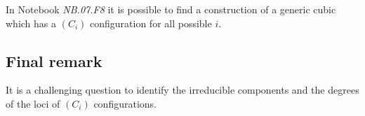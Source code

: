 \documentclass[a4paper, 11pt, reqno]{amsart}
\theoremstyle{plain}
\theoremstyle{definition}
\newcommand{\nb}[2]{\textsl{{NB}.{#1}.{#2}}}
\begin{document}
\medskip
In Notebook \nb{07}{F8} it is possible to find a construction of a
generic cubic which has a $(C_i)$ configuration for all possible $i$.

\subsection*{Final remark} It is a challenging question to identify the irreducible components and the degrees of the loci of $(C_i)$ configurations.




\end{document}
